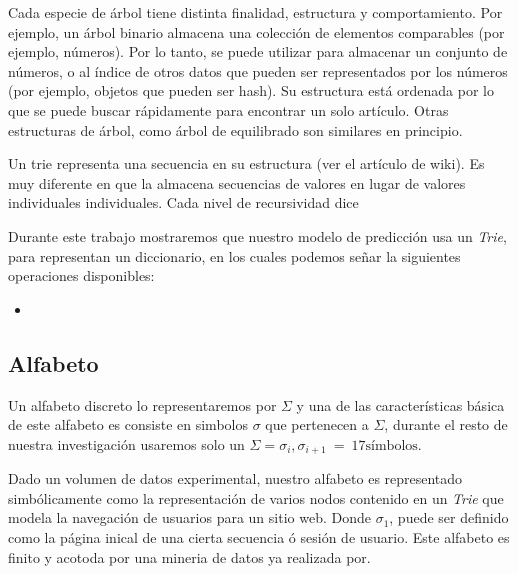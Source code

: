 Cada especie de árbol tiene distinta finalidad, estructura y comportamiento. Por ejemplo, un árbol binario almacena una colección de elementos comparables (por ejemplo, números). Por lo tanto, se puede utilizar para almacenar un conjunto de números, o al índice de otros datos que pueden ser representados por los números (por ejemplo, objetos que pueden ser hash). Su estructura está ordenada por lo que se puede buscar rápidamente para encontrar un solo artículo. Otras estructuras de árbol, como árbol de equilibrado son similares en principio.

Un trie representa una secuencia en su estructura (ver el artículo de wiki). Es muy diferente en que la almacena secuencias de valores en lugar de valores individuales individuales. Cada nivel de recursividad dice 


Durante este trabajo mostraremos que nuestro modelo de predicción usa un \emph{Trie}, para representan un diccionario, en los cuales podemos señar la siguientes operaciones disponibles:

	\begin{itemize}
	\item 

	\end{itemize}







\subsection{Alfabeto}

Un alfabeto discreto lo representaremos por $\Sigma$ y una de las características básica de este alfabeto es consiste en simbolos $\sigma$ que pertenecen a $\Sigma$, durante el resto de nuestra investigación usaremos solo un $\Sigma = \sigma_{i},\sigma_{i+1}\ =\ 17 \mbox{símbolos}$.

Dado un volumen de datos experimental, nuestro alfabeto es representado simbólicamente como la representación de varios nodos contenido en un \emph{Trie} que modela la navegación de usuarios para un sitio web.
Donde $\sigma_{1}$, puede ser definido como la página inical de una cierta secuencia  ó sesión de usuario. Este alfabeto es finito y acotoda por una mineria de datos ya realizada por. %

